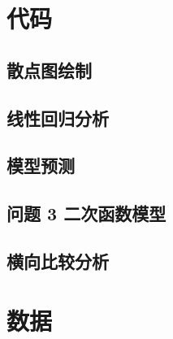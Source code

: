 \documentclass{article}
\begin{document}
\begin{appendices}

\section{代码}
\subsection{散点图绘制}

\subsection{线性回归分析}

\subsection{模型预测}

\subsection{问题 3 二次函数模型}

\subsection{横向比较分析}


\section{数据}


\end{appendices}
\end{document}
